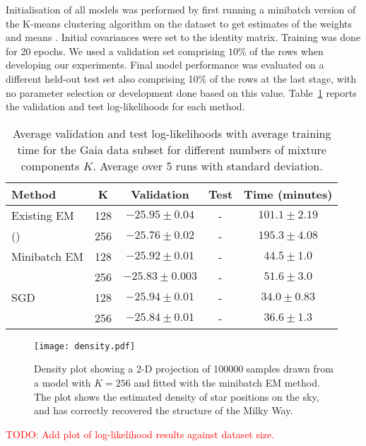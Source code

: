 \documentclass{article}
\newcommand{\todo}[1]{\textcolor{red}{TODO: #1}}
\begin{document}
Initialisation of all models was performed by first running a minibatch version of the K-means clustering algorithm on the dataset to get estimates of the weights and means \cite{sculleyWebscaleKmeansClustering2010}.
Initial covariances were set to the identity matrix.
Training was done for 20 epochs.
We used a validation set comprising $10\%$ of the rows when developing our experiments.
Final model performance was evaluated on a different held-out test set also comprising 10\% of the rows at the last stage, with no parameter selection or development done based on this value.
Table~\ref{results-table} reports the validation and test log-likelihoods for each method.

\begin{table}
  \caption{Average validation and test log-likelihoods with average training time for the Gaia data subset for different numbers of mixture components $K$.  Average over 5 runs with standard deviation.}
  \label{results-table}
  \centering
  \begin{tabular}{lcccc}
    \toprule
    Method     & K &  Validation     & Test & Time (minutes) \\
    \midrule
    Existing EM  & 128 & $-25.95 \pm 0.04$  & - & $101.1 \pm 2.19$    \\
    (\citet{bovyExtremeDeconvolutionInferring2011}) & 256 & $-25.76 \pm 0.02$ & - & $195.3 \pm 4.08$ \\
    \midrule
    Minibatch EM & 128 & $-25.92 \pm 0.01$ & - & $44.5 \pm 1.0$      \\
    & 256 & $-25.83 \pm 0.003$ & - & $51.6 \pm 3.0$ \\
    \midrule
    SGD  & 128  & $-25.94 \pm 0.01$ & - & $34.0 \pm 0.83$ \\
    & 256 &$-25.84 \pm 0.01$ & - & $36.6 \pm 1.3$ \\
    \bottomrule
  \end{tabular}
\end{table}

\begin{figure}
  \centering
  \texttt{[image: density.pdf]}
  \caption{Density plot showing a 2-D projection of 100000 samples drawn from a model with $K=256$ and fitted with the minibatch EM method.
  The plot shows the estimated density of star positions on the sky, and has correctly recovered the structure of the Milky Way.}
\end{figure}

\todo{Add plot of log-likelihood results against dataset size.}
\end{document}
